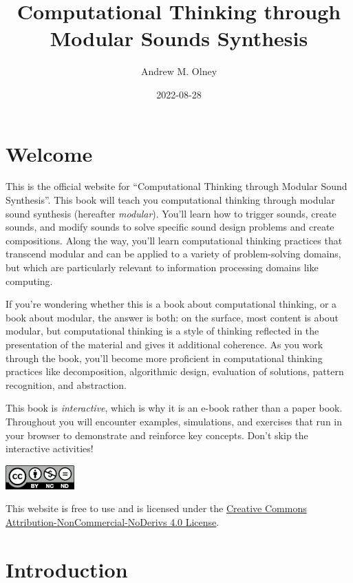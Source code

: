 \documentclass[
]{book}
\title{Computational Thinking through Modular Sounds Synthesis}
\author{Andrew M. Olney}
\date{2022-08-28}
\begin{document}
\maketitle

{
\hypersetup{linkcolor=}
\setcounter{tocdepth}{1}
\tableofcontents
}
\hypertarget{welcome}{%
\chapter*{Welcome}\label{welcome}}

This is the official website for ``Computational Thinking through Modular Sound Synthesis''. This book will teach you computational thinking through modular sound synthesis (hereafter \emph{modular}). You'll learn how to trigger sounds, create sounds, and modify sounds to solve specific sound design problems and create compositions. Along the way, you'll learn computational thinking practices that transcend modular and can be applied to a variety of problem-solving domains, but which are particularly relevant to information processing domains like computing.

If you're wondering whether this is a book about computational thinking, or a book about modular, the answer is both: on the surface, most content is about modular, but computational thinking is a style of thinking reflected in the presentation of the material and gives it additional coherence. As you work through the book, you'll become more proficient in computational thinking practices like decomposition, algorithmic design, evaluation of solutions, pattern recognition, and abstraction.

This book is \emph{interactive}, which is why it is an e-book rather than a paper book. Throughout you will encounter examples, simulations, and exercises that run in your browser to demonstrate and reinforce key concepts. Don't skip the interactive activities!

\includegraphics{images/by-nc-nd.png}

This website is free to use and is licensed under the \href{https://creativecommons.org/licenses/by-nc-nd/4.0/}{Creative Commons Attribution-NonCommercial-NoDerivs 4.0 License}.

\hypertarget{introduction}{%
\chapter{Introduction}\label{introduction}}
\end{document}
